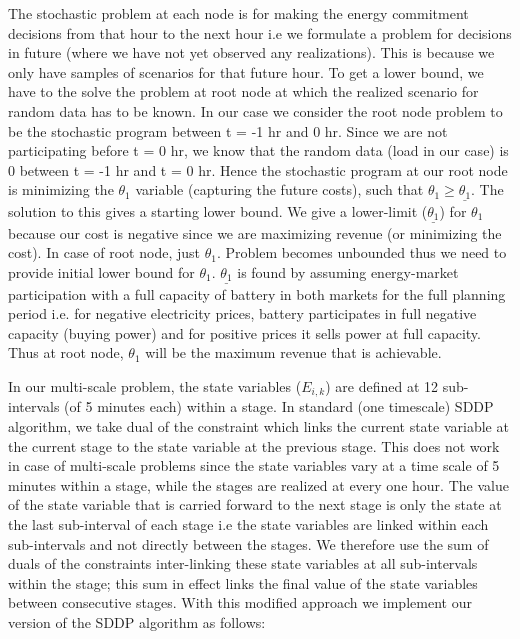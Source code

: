 \documentclass[11pt,twoside]{article}
\begin{document}
The stochastic problem at each node is for making the energy commitment decisions from that hour to the next hour i.e we formulate a problem for decisions in future (where we have not yet observed any realizations). This is because we only have samples of scenarios for that future hour. To get a lower bound, we have to the solve the problem at root node at which the realized scenario for random data has to be known. In our case we consider the root node problem to be the stochastic program between t = -1 hr and 0 hr. Since we are not participating before t = 0 hr, we know that the random data (load in our case) is 0 between t = -1 hr and t = 0 hr. Hence the stochastic program at our root node is minimizing the $\theta_{1}$ variable (capturing the future costs), such that $\theta_{1} \geq \underline{\theta_{1}}$. The solution to this gives a starting lower bound. We give a lower-limit ($\underline{\theta_{1}}$) for $\theta_1$ because our cost is negative since we are maximizing revenue (or minimizing the cost). In case of root node, just $\theta_1$. Problem becomes unbounded thus we need to provide initial lower bound for $\theta_1$. $\underline{\theta_{1}}$ is found by assuming energy-market participation with a full capacity of battery in both markets for the full planning period i.e. for negative electricity prices, battery participates in full negative capacity (buying power) and for positive prices it sells power at full capacity. Thus at root node, $\theta_1$ will be the maximum revenue that is achievable.   

In our multi-scale problem, the state variables ($E_{i,k}$) are defined at 12 sub-intervals (of 5 minutes each) within a stage.  In standard (one timescale) SDDP algorithm, we take dual of the constraint which links the current state variable at the current stage to the state variable at the previous stage. This does not work in case of multi-scale problems since the state variables vary at a time scale of 5 minutes within a stage, while the stages are realized at every one hour. The value of the state variable that is carried forward to the next stage is only the state at the last sub-interval of each stage i.e the state variables are linked within each sub-intervals and not directly between the stages. We therefore use the sum of duals of the constraints inter-linking these state variables at all sub-intervals within the stage; this sum in effect links the final value of the state variables between consecutive stages. With this modified approach we implement our version of the SDDP algorithm as follows:    
\end{document}
